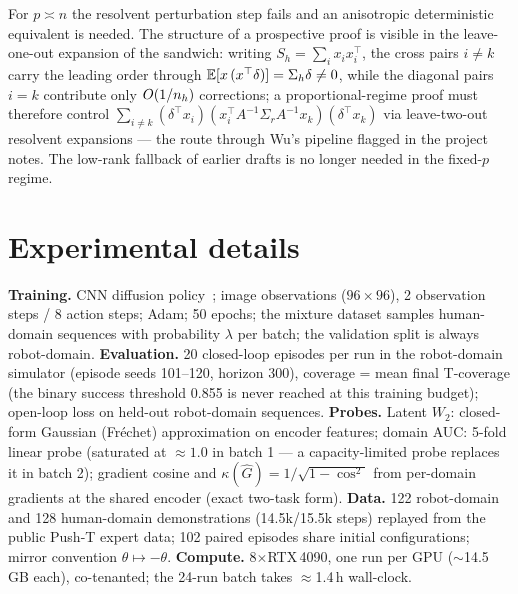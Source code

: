 \begin{remark}
For $p \asymp n$ the resolvent perturbation step fails and an anisotropic deterministic equivalent is needed.
The structure of a prospective proof is visible in the leave-one-out expansion of the sandwich: writing $S_h = \sum_i x_i x_i^\top$, the cross pairs $i \neq k$ carry the leading order through $\mathbb{E}[x\,(x^\top\delta)] = \Sigma_h\delta \neq 0$, while the diagonal pairs $i = k$ contribute only $O(1/n_h)$ corrections; a proportional-regime proof must therefore control $\sum_{i \neq k} (\delta^\top x_i)(x_i^\top A^{-1}\Sigma_r A^{-1} x_k)(\delta^\top x_k)$ via leave-two-out resolvent expansions --- the route through Wu's pipeline flagged in the project notes.
The low-rank fallback of earlier drafts is no longer needed in the fixed-$p$ regime.
\end{remark}

\section{Experimental details}
\label{supp:exp}

\textbf{Training.} CNN diffusion policy~\cite{chi2023diffusion}; image observations ($96\times96$), 2 observation steps / 8 action steps; Adam; 50 epochs; the mixture dataset samples human-domain sequences with probability $\lambda$ per batch; the validation split is always robot-domain.
\textbf{Evaluation.} 20 closed-loop episodes per run in the robot-domain simulator (episode seeds 101--120, horizon 300), coverage = mean final T-coverage (the binary success threshold 0.855 is never reached at this training budget); open-loop loss on held-out robot-domain sequences.
\textbf{Probes.} Latent $W_2$: closed-form Gaussian (Fr\'echet) approximation on encoder features; domain AUC: 5-fold linear probe (saturated at $\approx 1.0$ in batch 1 --- a capacity-limited probe replaces it in batch 2); gradient cosine and $\kappa(\hat G) = 1/\sqrt{1-\cos^2}$ from per-domain gradients at the shared encoder (exact two-task form).
\textbf{Data.} 122 robot-domain and 128 human-domain demonstrations (14.5k/15.5k steps) replayed from the public Push-T expert data; 102 paired episodes share initial configurations; mirror convention $\theta \mapsto -\theta$.
\textbf{Compute.} 8$\times$RTX\,4090, one run per GPU ($\sim$14.5\,GB each), co-tenanted; the 24-run batch takes $\approx$1.4\,h wall-clock.
